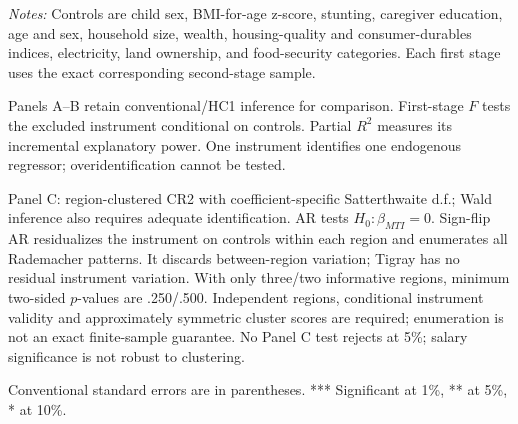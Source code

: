 \begin{table}[!htbp]
\begin{threeparttable}
\begin{tablenotes} \footnotesize
\item \textit{Notes:} Controls are child sex, BMI-for-age z-score, stunting, caregiver education, age and sex, household size, wealth, housing-quality and consumer-durables indices, electricity, land ownership, and food-security categories. Each first stage uses the exact corresponding second-stage sample.
\item Panels A--B retain conventional/HC1 inference for comparison. First-stage $F$ tests the excluded instrument conditional on controls. Partial $R^2$ measures its incremental explanatory power. One instrument identifies one endogenous regressor; overidentification cannot be tested.
\item Panel C: region-clustered CR2 with coefficient-specific Satterthwaite d.f.; Wald inference also requires adequate identification. AR tests $H_0:\beta_{MTI}=0$. Sign-flip AR residualizes the instrument on controls within each region and enumerates all Rademacher patterns. It discards between-region variation; Tigray has no residual instrument variation. With only three/two informative regions, minimum two-sided $p$-values are .250/.500. Independent regions, conditional instrument validity and approximately symmetric cluster scores are required; enumeration is not an exact finite-sample guarantee. No Panel C test rejects at 5\%; salary significance is not robust to clustering.
\item Conventional standard errors are in parentheses. *** Significant at 1\%, ** at 5\%, * at 10\%.
\end{tablenotes}
\end{threeparttable}
\end{table}
